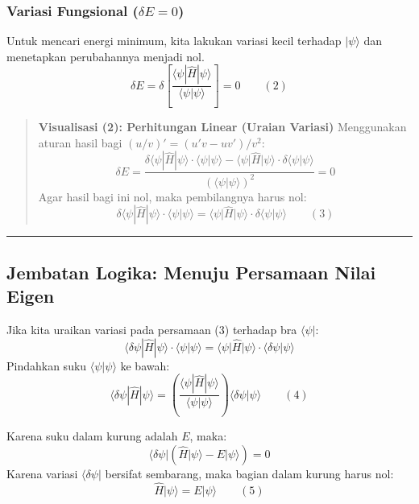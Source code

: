 \hypertarget{b.-variasi-fungsional-delta-e-0}{%
\subsubsection{\texorpdfstring{Variasi Fungsional (\(\delta E = 0\))}{Variasi Fungsional (\textbackslash delta E = 0)}}\label{b.-variasi-fungsional-delta-e-0}}

Untuk mencari energi minimum, kita lakukan variasi kecil terhadap \(|\psi\rangle\) dan menetapkan perubahannya menjadi nol. \[ \delta E = \delta \left[ \frac{\langle \psi | \hat{H} | \psi \rangle}{\langle \psi | \psi \rangle} \right] = 0 \qquad (2) \]

\begin{quote}
\textbf{Visualisasi (2): Perhitungan Linear (Uraian Variasi)} Menggunakan aturan hasil bagi \((u/v)' = (u'v - uv')/v^2\): \[ \delta E = \frac{\delta \langle \psi | \hat{H} | \psi \rangle \cdot \langle \psi | \psi \rangle - \langle \psi | \hat{H} | \psi \rangle \cdot \delta \langle \psi | \psi \rangle}{(\langle \psi | \psi \rangle)^2} = 0 \] Agar hasil bagi ini nol, maka pembilangnya harus nol: \[ \delta \langle \psi | \hat{H} | \psi \rangle \cdot \langle \psi | \psi \rangle = \langle \psi | \hat{H} | \psi \rangle \cdot \delta \langle \psi | \psi \rangle \qquad (3) \]
\end{quote}

\begin{center}\rule{0.5\linewidth}{0.5pt}\end{center}

\hypertarget{jembatan-logika-menuju-persamaan-nilai-eigen}{%
\subsection{Jembatan Logika: Menuju Persamaan Nilai Eigen}\label{jembatan-logika-menuju-persamaan-nilai-eigen}}

Jika kita uraikan variasi pada persamaan (3) terhadap bra \(\langle \psi |\): \[ \langle \delta \psi | \hat{H} | \psi \rangle \cdot \langle \psi | \psi \rangle = \langle \psi | \hat{H} | \psi \rangle \cdot \langle \delta \psi | \psi \rangle \] Pindahkan suku \(\langle \psi | \psi \rangle\) ke bawah: \[ \langle \delta \psi | \hat{H} | \psi \rangle = \left( \frac{\langle \psi | \hat{H} | \psi \rangle}{\langle \psi | \psi \rangle} \right) \langle \delta \psi | \psi \rangle \qquad (4) \]

Karena suku dalam kurung adalah \(E\), maka: \[ \langle \delta \psi | ( \hat{H} | \psi \rangle - E | \psi \rangle ) = 0 \] Karena variasi \(\langle \delta \psi |\) bersifat sembarang, maka bagian dalam kurung harus nol: \[ \hat{H} | \psi \rangle = E | \psi \rangle \qquad (5) \]

